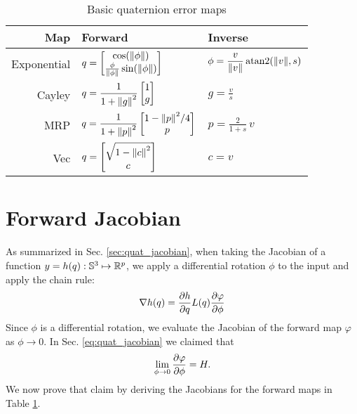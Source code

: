 \documentclass[../root.tex]{subfiles}
\begin{document}
\begin{table}[h!]
    \centering
    \begin{tabular}{r l l}
        Map & Forward & Inverse \\
        \midrule
        Exponential 
            & $ \displaystyle q = \begin{bmatrix} \cos(\norm{\phi}) \\ \frac{\phi}{\norm{\phi}} \sin(\norm{\phi}) \end{bmatrix} $ 
            & $ \displaystyle \phi = \frac{v}{\norm{v}} \, \text{atan2}(\norm{v}, s)  $ \\
        Cayley
            & $ \displaystyle q = \frac{1}{1 + \norm{g}^2} \begin{bmatrix} 1 \\ g \end{bmatrix} $ 
            & $ \displaystyle g = \frac{v}{s} $ \\
        MRP
            & $ \displaystyle q = \frac{1}{1 + \norm{p}^2} \begin{bmatrix} 1 - \norm{p}^2 /4 \\ p \end{bmatrix} $
            & $ \displaystyle p = \frac{2}{1+s} \, v$ \\
        Vec
            & $ \displaystyle q = \begin{bmatrix} \sqrt{1 - \norm{c}^2} \\ c \end{bmatrix} $ 
            & $ \displaystyle c = v $
    \end{tabular}
    \caption{Basic quaternion error maps}
    \label{tab:quat_error_maps}
\end{table}

\section{Forward Jacobian}
As summarized in Sec. \ref{sec:quat_jacobian}, when taking the Jacobian of a function 
$y = h(q) : \mathbb{S}^3 \mapsto \mathbb{R}^p$, we apply a differential rotation $\phi$ to the input and
apply the chain rule:
\begin{equation} \label{eq:quat_gradient2}
    \nabla h(q) = \pdv{h}{q}  L(q) \pdv{\varphi}{\phi}
\end{equation}
Since $\phi$ is a differential rotation, we evaluate the Jacobian of the
forward map $\varphi$ as $\phi \rightarrow 0$. In Sec. \ref{eq:quat_jacobian}
we claimed that 
\begin{equation} \label{eq:quat_forward_identity}
    \lim_{\phi \rightarrow 0} \pdv{\varphi}{\phi} = H.
\end{equation}
We now prove that claim by deriving the Jacobians for the forward maps in
Table \ref{tab:quat_error_maps}.
\end{document}
